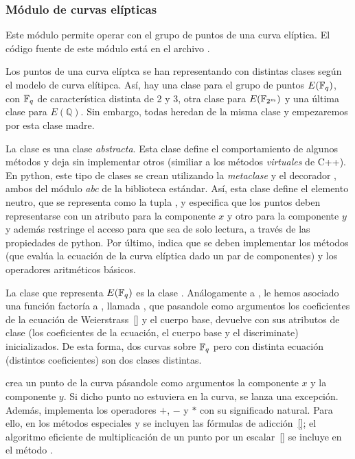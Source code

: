 \subsubsection{Módulo de curvas elípticas}
\label{subs:Módulo de curvas elípticas}

Este módulo permite operar con el grupo de puntos de una curva elíptica. El código fuente de este módulo está en el archivo .

Los puntos de una curva elíptca se han representando con distintas clases según el modelo de curva elítipca. Así, hay una clase para el grupo de puntos $E(\mathbb{F}_q)$, con $\mathbb{F}_q$ de característica distinta de 2 y 3, otra clase para $E(\mathbb{F}_{2^m})$ y una última clase para $E(\mathbb{Q})$. Sin embargo, todas heredan de la misma clase y empezaremos por esta clase madre.

La clase  es una clase \emph{abstracta}. Esta clase define el comportamiento de algunos métodos y deja sin implementar otros (similiar a los métodos \emph{virtuales} de C++). En python, este tipo de clases se crean utilizando la \emph{metaclase}  y el decorador , ambos del módulo \emph{abc} de la biblioteca estándar. Así, esta clase define el elemento neutro, que se representa como la tupla , y especifica que los puntos deben representarse con un atributo para la componente $x$ y otro para la componente $y$ y además restringe el acceso para que sea de solo lectura, a través de las propiedades de python. Por último, indica que se deben implementar los métodos  (que evalúa la ecuación de la curva elíptica dado un par de componentes) y los operadores aritméticos básicos.

La clase que representa $E(\mathbb{F}_q)$ es la clase . Análogamente a , le hemos asociado una función factoría a , llamada , que pasandole como argumentos los coeficientes de la ecuación de Weierstrass~\ref{} y el cuerpo base, devuelve  con sus atributos de clase (los coeficientes de la ecuación, el cuerpo base y el discriminate) inicializados. De esta forma, dos curvas sobre $\mathbb{F}_q$ pero con distinta ecuación (distintos coeficientes) son dos clases distintas.

 crea un punto de la curva pásandole como argumentos la componente $x$ y la componente $y$. Si dicho punto no estuviera en la curva, se lanza una excepción. Además,  implementa los operadores $+$, $-$ y $*$ con su significado natural. Para ello, en los métodos especiales  y  se incluyen las fórmulas de adicción~\ref{}; el algoritmo eficiente de multiplicación de un punto por un escalar~\ref{} se incluye en el método .

